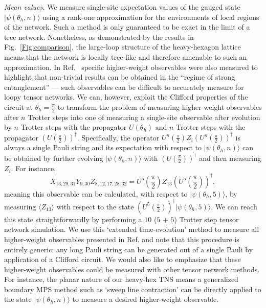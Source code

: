 \documentclass[%
 superscriptaddress,
 amsmath,amssymb,
 prx,
]{revtex4-2}
\begin{document}
\par \emph{Mean values.} We measure single-site expectation values of the gauged state $\vert \psi(\theta_{h}, n) \rangle$ using a rank-one approximation for the environments of local regions of the network. Such a method is only guaranteed to be exact in the limit of a tree network. Nonetheless, as demonstrated by the results in Fig.~\ref{Fig:comparison}, the large-loop structure of the 
heavy-hexagon lattice means that the network is locally tree-like and therefore amenable to such an approximation. In Ref.~\cite{kim2023} specific higher-weight observables were also measured to highlight that non-trivial results can be obtained in the ``regime of strong entanglement'' --- such observables can be difficult to accurately measure for loopy tensor networks. 
We can, however, exploit the Clifford properties of the circuit at $\theta_{h} = \frac{\pi}{2}$ to transform the problem of measuring higher-weight observables after $n$ Trotter steps into one of measuring a single-site observable after evolution by $n$ Trotter steps with the propagator $U(\theta_{h})$ and $n$ Trotter steps with the propagator $\left(U(\frac{\pi}{2})\right)^{\dagger}$. 
Specifically, the operator $U^{n}\left(\frac{\pi}{2}\right)Z_{i}\left(U^{n}\left(\frac{\pi}{2}\right)\right)^{\dagger}$ is always a single Pauli string and its expectation with respect to $\vert \psi(\theta_{h}, n) \rangle$ can be obtained by further evolving $\vert \psi(\theta_{h}, n) \rangle$ with $\left(U(\frac{\pi}{2})\right)^{\dagger}$ and then measuring $Z_{i}$. For instance,
\begin{equation}
    X_{13, 29, 31}Y_{9,30}Z_{8,12,17,28,32} =  U^{5}\left(\frac{\pi}{2}\right)Z_{13}\left(U^{5}\left(\frac{\pi}{2}\right)\right)^{\dagger},
\end{equation} 
meaning this observable can be calculated, with respect to $\vert \psi(\theta_h,5) \rangle$, by measuring $\langle Z_{13} \rangle$ with respect to the state $\left( U^{5}\left(\frac{\pi}{2}\right)\right)^{\dagger}\vert \psi(\theta_h,5) \rangle$. We can reach this state straightforwardly by performing a $10$ ($5$ + $5$) Trotter step tensor network simulation. We use this `extended time-evolution' method to measure all higher-weight observables presented in Ref. \cite{kim2023} and note that this procedure is entirely generic: any long Pauli string can be generated out of a single Pauli by application of a Clifford circuit. We would also like to emphasize that these higher-weight observables could be measured with other tensor network methods. For instance, the planar nature of our heavy-hex TNS means a generalized boundary MPS \cite{Verstraete2004} method such as `sweep line contraction' \cite{chubb2021general} can be directly applied to the state $|\psi(\theta_h,n) \rangle$ to measure a desired higher-weight observable.
\end{document}
